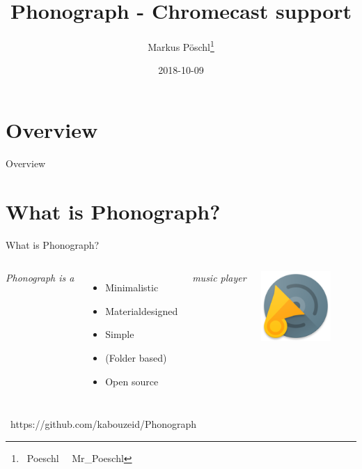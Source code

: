 \documentclass[final, english, xcolor=pdftex, dvipsnames, handout, table, aspectratio=169, 14pt]{beamer}
\begin{document}
\title[Phonograph]{Phonograph - Chromecast support}
\author[]{Markus Pöschl\footnote{\faGithub \ Poeschl \, \faTwitter \ Mr\_Poeschl}}
\date{2018-10-09} %


\begin{frame}
\maketitle
\end{frame}

\section*{Overview}
\begin{frame}{Overview} %
\tableofcontents
\end{frame}

\section{What is Phonograph?}

\begin{frame}{What is Phonograph?}

\begin{block}{}
\begin{columns}[onlytextwidth,T]

\textit{Phonograph is a}
\begin{itemize}
  \item Minimalistic
  \item Materialdesigned
  \item Simple
  \item (Folder based)
  \item Open source
\end{itemize}
\textit{music player}

\centering\includegraphics[width=100px]{pictures/icon_web.png}
\end{columns}
\end{block}
\vspace{20px}

\centering\faGithub \, \normalsize https://github.com/kabouzeid/Phonograph

\end{frame}
\end{document}
